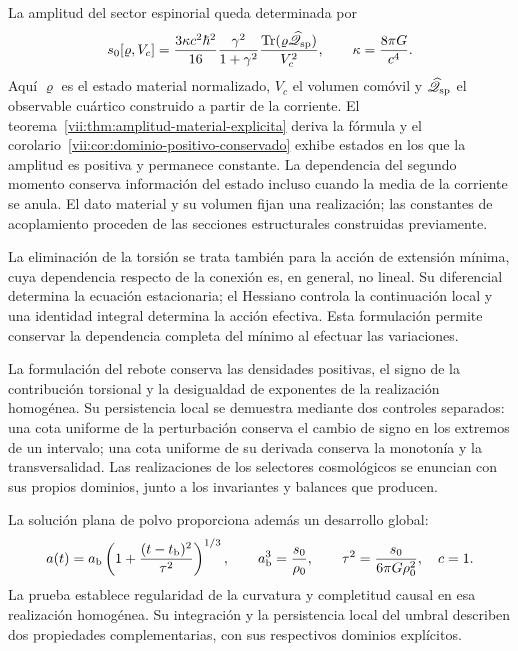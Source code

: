 La amplitud del sector espinorial queda determinada por
\begin{equation}
 s_0[\varrho,V_c]
 =\frac{3\kappa c^2\hbar^2}{16}
   \frac{\gamma^2}{1+\gamma^2}
   \frac{\operatorname{Tr}
    (\varrho\widehat{\mathscr Q}_{\rm sp})}{V_c^2},
 \qquad \kappa=\frac{8\pi G}{c^4}.
 \label{vii:eq:programa-amplitud}
\end{equation}
Aquí \(\varrho\) es el estado material normalizado, \(V_c\) el volumen
comóvil y \(\widehat{\mathscr Q}_{\rm sp}\) el observable cuártico
construido a partir de la corriente. El
teorema~\ref{vii:thm:amplitud-material-explicita} deriva la fórmula y
el corolario~\ref{vii:cor:dominio-positivo-conservado} exhibe estados
en los que la amplitud es positiva y permanece constante. La dependencia
del segundo momento conserva información del estado incluso cuando la
media de la corriente se anula. El dato material y su volumen fijan una
realización; las constantes de acoplamiento proceden de las secciones
estructurales construidas previamente.

La eliminación de la torsión se trata también para la acción de
extensión mínima, cuya dependencia respecto de la conexión es, en
general, no lineal. Su diferencial determina la ecuación estacionaria;
el Hessiano controla la continuación local y una identidad integral
determina la acción efectiva. Esta formulación permite conservar la
dependencia completa del mínimo al efectuar las variaciones.

La formulación del rebote conserva las densidades positivas, el signo de
la contribución torsional y la desigualdad de exponentes de la realización
homogénea. Su persistencia local se demuestra mediante dos controles
separados: una cota uniforme de la perturbación conserva el cambio de
signo en los extremos de un intervalo; una cota uniforme de su derivada
conserva la monotonía y la transversalidad. Las realizaciones de los
selectores cosmológicos se enuncian con sus propios dominios, junto a los
invariantes y balances que producen.

La solución plana de polvo proporciona además un desarrollo global:
\[
 a(t)=a_{\rm b}\left(1+
       \frac{(t-t_{\rm b})^2}{\tau^2}\right)^{1/3},
 \qquad
 a_{\rm b}^3=\frac{s_0}{\rho_0},\qquad
 \tau^2=\frac{s_0}{6\pi G\rho_0^2},
 \quad c=1.
\]
La prueba establece regularidad de la curvatura y completitud causal
en esa realización homogénea. Su integración y la persistencia local
del umbral describen dos propiedades complementarias, con sus
respectivos dominios explícitos.


